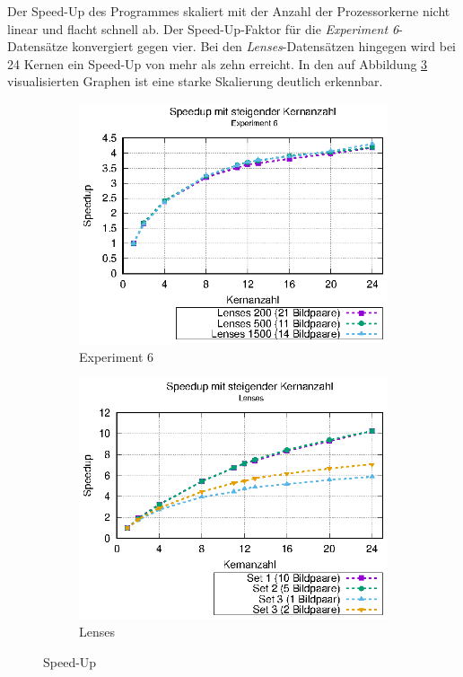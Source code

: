 Der Speed-Up des Programmes skaliert mit der Anzahl der Prozessorkerne nicht linear und flacht schnell ab. Der Speed-Up-Faktor für die \textit{Experiment 6}-Datensätze konvergiert gegen vier. Bei den \textit{Lenses}-Da\-ten\-sä\-tzen hingegen wird bei 24 Kernen ein Speed-Up von mehr als zehn erreicht. In den auf Abbildung \ref{fig:speedup} visualisierten Graphen ist eine starke Skalierung deutlich erkennbar. 

\begin{center}
	\begin{figure}[h!]
		\begin{subfigure}[b]{0.49\textwidth}
			\centering
			\includegraphics[width=\textwidth]{pdf/speedup_exp6}
			\caption{Experiment 6}
			\label{fig:speedup_exp6}
		\end{subfigure}
		\hfill
		\begin{subfigure}[b]{0.49\textwidth}
			\centering
			\includegraphics[width=\textwidth]{pdf/speedup_lenses}
			\caption{Lenses}
			\label{fig:speedup_lenses}
		\end{subfigure}
		\caption{Speed-Up}
		\label{fig:speedup}
	\end{figure}
\end{center}


